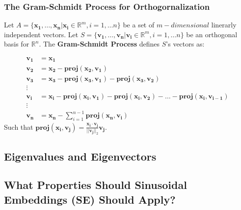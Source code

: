 \documentclass{article}
\begin{document}
\subsubsection{The Gram-Schmidt Process for Orthogornalization}

Let $A = \{\mathbf{x_1, \ldots, x_n} | \mathbf{x_i} \in \mathbb{R}^m, i = 1, \ldots n \}$ be a set of $m-dimensional$ linerarly independent vectors. Let $S = \{\mathbf{v_1, \ldots, v_n} | \mathbf{v_i} \in \mathbb{R}^m, i = 1, \ldots n \}$ be an orthogonal basis for $\mathbb{R}^n$. The \textbf{Gram-Schmidt Process} defines $S$'s vectors as:


\begin{align}
	\mathbf{v_1} &= \mathbf{x_1} \\
	\mathbf{v_2} & = \mathbf{x_2} - \mathbf{proj(x_2, v_1)} \\
	\mathbf{v_3} & = \mathbf{x_3} - \mathbf{proj(x_3, v_1)} -  \mathbf{proj(x_3, v_2)} \\
	\vdots & \\
	\mathbf{v_i} &= \mathbf{x_i} - \mathbf{proj(x_i, v_1)} -  \mathbf{proj(x_i, v_2)}  - \ldots - \mathbf{proj(x_i, v_{i - 1})} \\
	\vdots & \\
	\mathbf{v_n} &= \mathbf{x_n} -  \sum_{i = 1}^{n - 1} {\mathbf{proj(x_n, v_i)}} 
\end{align}
Such that  $ \mathbf{proj(x_i, v_j)}=  \frac{\mathbf{x_i \cdot v_j}}{||\mathbf{v_j}||_2}\mathbf{v_j}$.

\subsection{Eigenvalues and Eigenvectors}


\subsection{What Properties Should Sinusoidal Embeddings (SE) Should Apply?}
\end{document}
